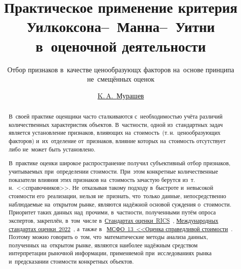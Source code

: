 \documentclass[]{scrreprt}
\title{Практическое применение критерия Уилкоксона--~Манна--~Уитни в~оценочной деятельности}
\subtitle{Отбор признаков в~качестве ценообразующх факторов на~основе принципа не~смещённых оценок}
\author{\href{https://www.facebook.com/murashev.kirill/}{K.\,A.~{Мурашев}}}
\begin{document}
	
\maketitle
%
%	
\begin{abstract}
	В~своей практике оценщики часто сталкиваются с~необходимостью учёта различий количественных характеристик объектов. В~частности, одной из~стандартных задач является установление признаков, влияющих на~стоимость~(т.\,н.~ценообразующих факторов) и~их~отделение от~признаков, влияние которых на~стоимость отсутствует либо не~может быть установлено.
	
	В~практике оценки широкое распространение получил субъективный отбор признаков, учитываемых при~определении стоимости. При~этом конкретные количественные показатели влияния этих признаков на~стоимость зачастую берутся из~т.\,н.~<<справочников>>. Не~отказывая такому подходу в~быстроте и~невысокой стоимости его~реализации, нельзя не~признать, что~только данные, непосредственно наблюдаемые на~открытом рынке, являются надёжной основой суждения о~стоимости. Приоритет таких данных над~прочими, в~частности, полученными путём опроса экспертов, закреплён, в~том~числе в~\href{https://www.rics.org/uk/upholding-professional-standards/sector-standards/valuation/red-book/red-book-global/}{Стандартах оценки~RICS}~\cite{RVGS-2022}, \href{https://www.rics.org/uk/upholding-professional-standards/sector-standards/valuation/red-book/international-valuation-standards/}{Международных стандартах оценки~2022}~\cite{IVS-2022}, а~также в~ \href{https://normativ.kontur.ru/document?moduleId=1&documentId=326168#l0}{МСФО~13~<<Оценка справедливой стоимости}~\cite{MSFO-13}. Поэтому можно говорить о~том, что~математические методы анализа данных, полученных на~открытом рынке, являются наиболее надёжным средством интерпретации рыночной информации, применяемой при~исследованиях рынка и~предсказании стоимости конкретных объектов.
	

\end{abstract}
\end{document}
